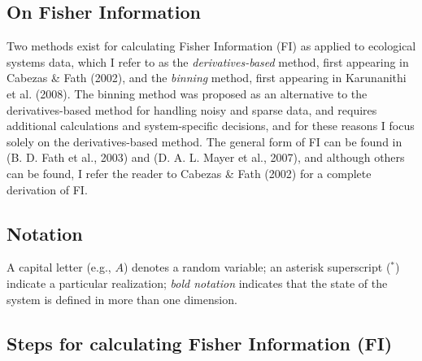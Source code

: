 \documentclass[12pt,twoside,openany]{reedthesis}
\begin{document}
\subsection{On Fisher Information}\label{on-fisher-information}

Two methods exist for calculating Fisher Information (FI) as applied to
ecological systems data, which I refer to as the
\emph{derivatives-based} method, first appearing in Cabezas \& Fath
(2002), and the \emph{binning} method, first appearing in Karunanithi et
al. (2008). The binning method was proposed as an alternative to the
derivatives-based method for handling noisy and sparse data, and
requires additional calculations and system-specific decisions, and for
these reasons I focus solely on the derivatives-based method. The
general form of FI can be found in (B. D. Fath et al., 2003) and (D. A.
L. Mayer et al., 2007), and although others can be found, I refer the
reader to Cabezas \& Fath (2002) for a complete derivation of FI.

\subsection{Notation}\label{notation}

A capital letter (e.g., \(A\)) denotes a random variable; an asterisk
superscript (\(^*\)) indicate a particular realization; \emph{bold
notation} indicates that the state of the system is defined in more than
one dimension.

\subsection{Steps for calculating Fisher Information
(FI)}\label{steps-for-calculating-fisher-information-fi}
\end{document}
